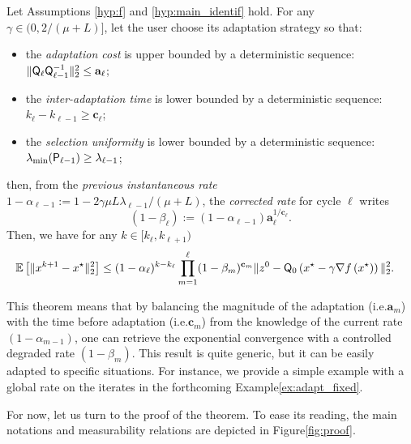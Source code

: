 \begin{theorem}\label{th:conv_nondis_arbitrary}
Let Assumptions \ref{hyp:f} and  \ref{hyp:main_identif} hold.  For any $\gamma\in(0,2/(\mu+L)]$, let the user choose its adaptation strategy so that:
\begin{itemize}
    \item  the \emph{adaptation cost} is upper bounded by a deterministic sequence:  $ \|  {\mathsf{Q}}_\ell   {\mathsf{Q}}_{\ell-1}^{-1} \|_2^2 \leq \mathbf{a}_\ell $;
    \item the \emph{inter-adaptation time} is lower bounded by a deterministic sequence: $k_{\ell}-k_{\ell-1}\geq \mathbf{c}_\ell$;
    \item the \emph{selection uniformity} is lower bounded by a deterministic sequence: $\lambda_{ \min}({\mathsf{P}}_{\ell-1}) \geq \lambda_{\ell-1} $;
\end{itemize}
then, from the \emph{previous instantaneous rate} $1-\alpha_{\ell-1}  := 1 -  2\gamma \mu L \lambda_{\ell-1}/(\mu + L)  $, the \emph{corrected rate} for cycle $\ell$ writes  
\begin{equation}\label{eq:corr-rate}
(1-\beta_\ell) := (1-\alpha_{\ell-1})\mathbf{a}_\ell^{1/\mathbf{c}_\ell}. 
\end{equation}
Then, we have for any $k\in [k_\ell,k_{\ell+1})$
\begin{align*}
    \EE\left[\|x^{k+1}-x^\star\|_2^2\right] &\leq (1-\alpha_\ell)^{k-k_\ell} \prod_{m=1}^\ell (1-\beta_m)^{\mathbf{c}_m}  \|z^{0}-\bQ_0\left(x^\star - \gamma\nabla f\left(x^\star\right)\right)\|_2^2. %
\end{align*}
\end{theorem}

{This theorem means that by balancing the magnitude of the adaptation (i.e.\;$\mathbf{a}_m$) with the time before adaptation (i.e.\;$\mathbf{c}_m$) from the knowledge of the current rate $(1-\alpha_{m-1})$, one can retrieve the exponential convergence with a controlled degraded rate $(1-\beta_m)$. 
This result is quite generic, but it can be easily adapted to specific situations.
For instance, we provide a simple example with a global rate on the iterates in the forthcoming Example\;\ref{ex:adapt_fixed}.

For now, let us turn to the proof of the theorem. To ease its reading, the main notations and measurability relations are depicted in Figure\;\ref{fig:proof}.

}


